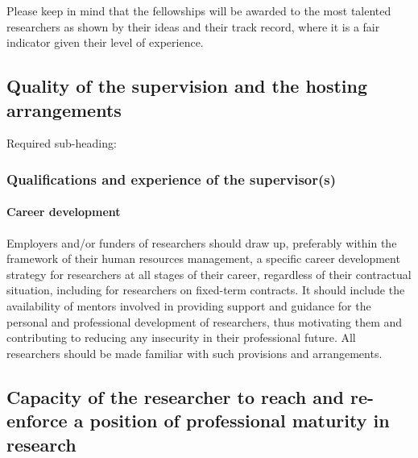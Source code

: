 Please keep in mind that the fellowships will be awarded to the most talented researchers as shown by their ideas and their track record, where it is a fair indicator given their level of experience.
\subsection{Quality of the supervision and the hosting arrangements}
\label{sec:supervision}

Required sub-heading:
\subsubsection*{Qualifications and experience of the supervisor(s)}


\paragraph{Career development}
Employers and/or funders of researchers should draw up, preferably within the framework of their human resources management, a specific career development strategy for researchers at all stages of their career, regardless of their contractual situation, including for researchers on fixed-term contracts. It should include the availability of mentors involved in providing support and guidance for the personal and professional development of researchers, thus motivating them and contributing to reducing any insecurity in their professional future. All researchers should be made familiar with such provisions and arrangements.

\subsection{Capacity of the researcher to reach and re-enforce a position of professional maturity in research}
\label{sec:maturity}

